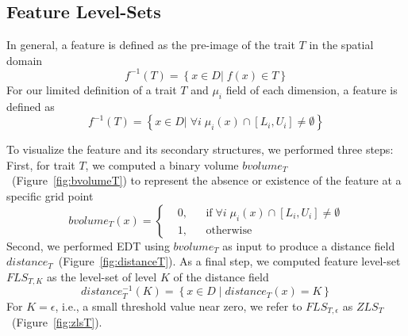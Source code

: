 \vspace{-1mm}
\subsection{Feature Level-Sets}
\label{sec:fls}
In general, a feature is defined as the pre-image of the trait $T$ in the spatial domain
\begin{equation}
f^{-1}(T) = \left\{ x \in D |\; f(x) \in T \right\}
\end{equation}
%
For our limited definition of a trait $T$ and ${\mu}_{i}$ field of each dimension, a feature is defined as 
\begin{equation}
f^{-1}(T) = \left\{ x \in D |\; \forall i\;{\mu}_{i}(x) \cap [L_{i}, U_{i}] \neq \emptyset\right\}
\end{equation}

To visualize the feature and its secondary structures, we performed three steps:
%
First, for trait $T$, we computed a binary volume $bvolume_{T}$~(Figure~\ref{fig:bvolumeT}) to represent the absence or existence of the feature at a specific grid point
%
\begin{equation}
  bvolume_{T}(x) = \left \{
  \begin{aligned}
    &0, && \text{if}\; \forall i\; {\mu}_{i}(x) \cap [L_{i}, U_{i}] \neq \emptyset \\
    &1, && \text{otherwise}
  \end{aligned} \right.
\end{equation}
%
Second, we performed EDT using $bvolume_{T}$ as input to produce a distance field $distance_{T}$~(Figure~\ref{fig:distanceT}). 
%
%
As a final step, we computed feature level-set $FLS_{T,K}$ as the level-set of level $K$ of the distance field
%
\begin{equation} 
distance_{T}^{-1}(K) = \left\{ x \in D\; |\; distance_{T}(x) = K\right\}
\end{equation}
%
For $K = \epsilon$, i.e., a small threshold value near zero, we refer to $FLS_{T,\epsilon}$ as $ZLS_{T}$~(Figure~\ref{fig:zlsT}).
%
%

